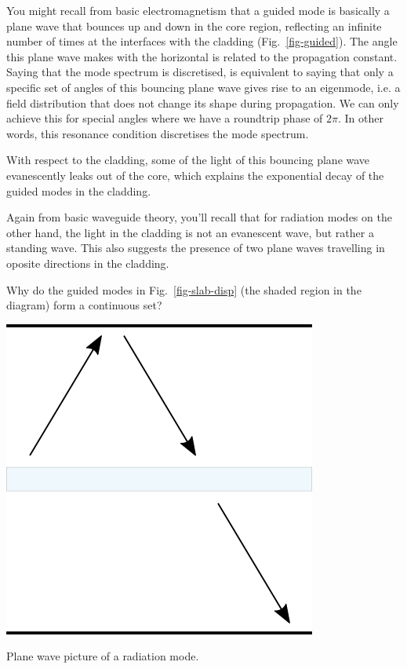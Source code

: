 You might recall from basic electromagnetism that a guided mode is basically a plane wave that bounces up and down in the core region, reflecting an infinite number of times at the interfaces with the cladding (Fig.~\ref{fig-guided}). The angle this plane wave makes with the horizontal is related to the propagation constant. Saying that the mode spectrum is discretised, is equivalent to saying that only a specific set of angles of this bouncing plane wave gives rise to an eigenmode, i.e. a field distribution that does not change its shape during propagation. We can only achieve this for special angles where we have a roundtrip phase of $2 \pi$. In other words, this resonance condition discretises the mode spectrum.

With respect to the cladding, some of the light of this bouncing plane wave evanescently leaks out of the core, which explains the exponential decay of the guided modes in the cladding.

Again from basic waveguide theory, you'll recall that for radiation modes on the other hand, the light in the cladding is not an evanescent wave, but rather a standing wave. This also suggests the presence of two plane waves travelling in oposite directions in the cladding.

\begin{cue}
Why do the guided modes in Fig.~\ref{fig-slab-disp} (the shaded region in the diagram) form a continuous set?
\end{cue}

\begin{marginfigure}
\centering
\includegraphics{symmetry/figures/radiation}
\caption{Plane wave picture of a radiation mode.}
\label{fig-radiation}
\end{marginfigure}

